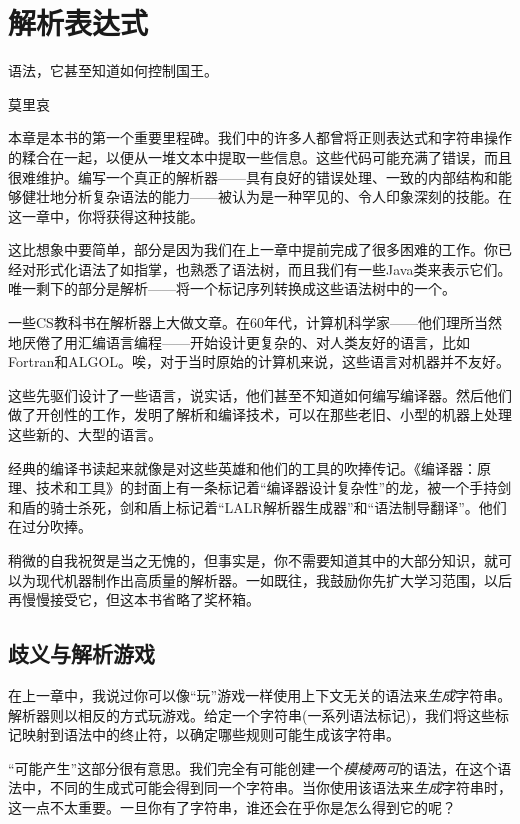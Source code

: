 \documentclass[cn,11pt,chinese]{elegantbook}
\begin{document}
\chapter{解析表达式}

\epigraph{语法，它甚至知道如何控制国王。}{莫里哀}

本章是本书的第一个重要里程碑。我们中的许多人都曾将正则表达式和字符串操作的糅合在一起，以便从一堆文本中提取一些信息。这些代码可能充满了错误，而且很难维护。编写一个真正的解析器——具有良好的错误处理、一致的内部结构和能够健壮地分析复杂语法的能力——被认为是一种罕见的、令人印象深刻的技能。在这一章中，你将获得这种技能。

这比想象中要简单，部分是因为我们在上一章中提前完成了很多困难的工作。你已经对形式化语法了如指掌，也熟悉了语法树，而且我们有一些Java类来表示它们。唯一剩下的部分是解析——将一个标记序列转换成这些语法树中的一个。

一些CS教科书在解析器上大做文章。在60年代，计算机科学家——他们理所当然地厌倦了用汇编语言编程——开始设计更复杂的、对人类友好的语言，比如Fortran和ALGOL。唉，对于当时原始的计算机来说，这些语言对机器并不友好。

这些先驱们设计了一些语言，说实话，他们甚至不知道如何编写编译器。然后他们做了开创性的工作，发明了解析和编译技术，可以在那些老旧、小型的机器上处理这些新的、大型的语言。

经典的编译书读起来就像是对这些英雄和他们的工具的吹捧传记。《编译器：原理、技术和工具》的封面上有一条标记着“编译器设计复杂性”的龙，被一个手持剑和盾的骑士杀死，剑和盾上标记着“LALR解析器生成器”和“语法制导翻译”。他们在过分吹捧。

稍微的自我祝贺是当之无愧的，但事实是，你不需要知道其中的大部分知识，就可以为现代机器制作出高质量的解析器。一如既往，我鼓励你先扩大学习范围，以后再慢慢接受它，但这本书省略了奖杯箱。

\section{歧义与解析游戏}

在上一章中，我说过你可以像“玩”游戏一样使用上下文无关的语法来\textit{生成}字符串。解析器则以相反的方式玩游戏。给定一个字符串(一系列语法标记)，我们将这些标记映射到语法中的终止符，以确定哪些规则可能生成该字符串。

“可能产生”这部分很有意思。我们完全有可能创建一个\textit{模棱两可}的语法，在这个语法中，不同的生成式可能会得到同一个字符串。当你使用该语法来\textit{生成}字符串时，这一点不太重要。一旦你有了字符串，谁还会在乎你是怎么得到它的呢？
\end{document}
